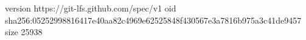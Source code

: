 version https://git-lfs.github.com/spec/v1
oid sha256:05252998816417e40aa82c4969e62525848f430567e3a7816b975a3c41de9457
size 25938
